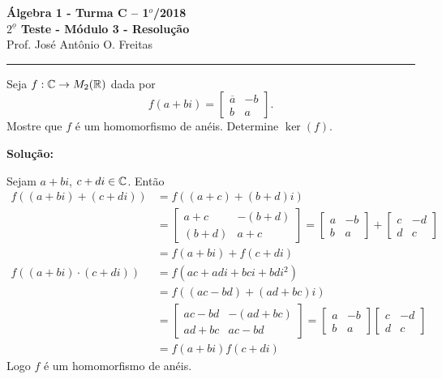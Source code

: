 \documentclass[12pt]{article}
\begin{document}


\begin{center}
{\Large\bf {\'A}lgebra 1 - Turma C -- 1$^{o}$/2018} \\ \vspace{9pt} {\large\bf
  $2^{\underline{o}}$ Teste - Módulo 3 - Resolu\c{c}\~ao}\\
\vspace{9pt} Prof. Jos{\'e} Ant{\^o}nio O. Freitas
\end{center}
\hrule

\vspace{.6cm}

\questao Seja $f : \mathbb{C} \to M_2(\mathbb{R})$ dada por
\[
	f(a + bi) = \begin{bmatrix}
		\overline{a} & -b\\
		b & a
	\end{bmatrix}.
\]
Mostre que $f$ é um homomorfismo de anéis. Determine $\ker(f)$.

\noindent\textbf{Solu\c{c}\~ao:}

Sejam $a + bi$, $c + di \in \mathbb{C}$. Então
\begin{align*}
	f((a + bi) + (c + di)) &= f((a + c) + (b + d)i) \\&= \begin{bmatrix}
		a + c & -(b + d)\\
		(b + d) & a + c
	\end{bmatrix} = \begin{bmatrix}
		a & -b\\
		b & a
	\end{bmatrix} + \begin{bmatrix}
		c & -d\\
		d & c
	\end{bmatrix}\\ &= f(a + bi) + f(c + di)\\
	f((a + bi)\cdot (c + di)) &= f(ac + adi + bci + bdi^2) \\ &= f((ac - bd) + (ad + bc)i) \\ &= \begin{bmatrix}
		ac - bd & -(ad + bc)\\
		ad + bc & ac - bd
	\end{bmatrix} = \begin{bmatrix}
		a & -b\\
		b & a
	\end{bmatrix} \begin{bmatrix}
		c & -d\\
		d & c
	\end{bmatrix}\\ &= f(a + bi)f(c + di)
\end{align*}
Logo $f$ é um homomorfismo de anéis.
\end{document}
